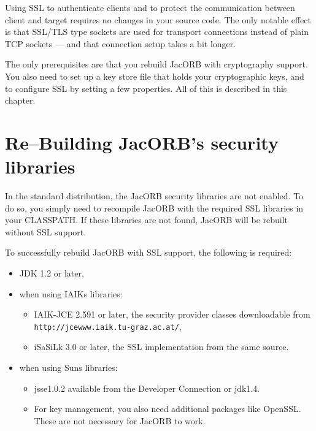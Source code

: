 \documentclass[12pt]{scrbook}
\begin{document}
Using  SSL to authenticate  clients and  to protect  the communication
between client and target requires no changes in your source code. The
only  notable  effect  is  that  SSL/TLS type  sockets  are  used  for
transport  connections  instead of  plain  TCP  sockets  --- and  that
connection setup takes a bit longer.

The only  prerequisites are that you rebuild  JacORB with cryptography
support. You  also need  to set up  a key  store file that  holds your
cryptographic   keys,  and  to   configure  SSL   by  setting   a  few
properties. All of this is described in this chapter.

\section{Re--Building JacORB's security libraries}

In the  standard distribution, the  JacORB security libraries  are not
enabled.   To do  so, you  simply need  to recompile  JacORB  with the
required SSL libraries  in your CLASSPATH.  If these libraries
are not found, JacORB will be rebuilt without SSL support.

To  successfully rebuild  JacORB with  SSL support,  the  following is
required:

\begin{itemize}
        \item JDK 1.2 or later,
        
        \item when using IAIKs libraries:
              \begin{itemize}
                \item IAIK-JCE 2.591 or later, the security provider classes
                downloadable from \\ {\tt http://jcewww.iaik.tu-graz.ac.at/},
              \item iSaSiLk 3.0 or later, the SSL implementation from the same
                source.
              \end{itemize}

        \item when using Suns libraries:
              \begin{itemize}
              \item jsse1.0.2 available from the Developer Connection or
                jdk1.4.
              \item For key management, you also need additional packages like
                OpenSSL. These are not necessary for JacORB to work.
              \end{itemize}
\end{itemize}
\end{document}

